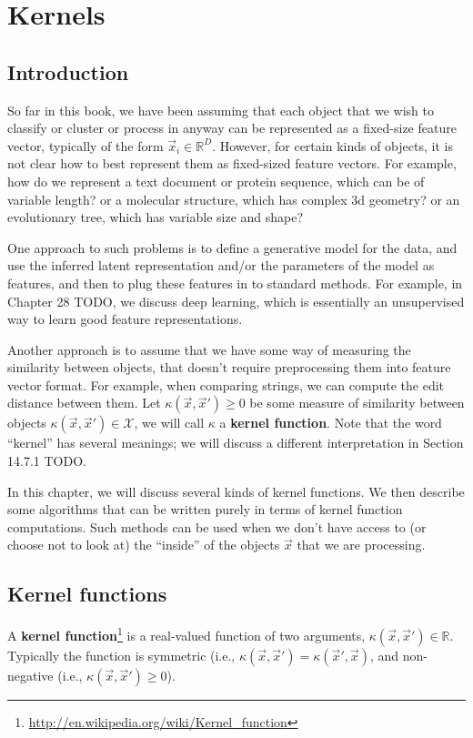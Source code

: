 \chapter{Kernels}
\label{chap:Kernels}

\section{Introduction}
So far in this book, we have been assuming that each object that we wish to classify or cluster or process in anyway can be represented as a fixed-size feature vector, typically of the form $\vec{x}_i \in \mathbb{R}^D$. However, for certain kinds of objects, it is not clear how to best represent them as fixed-sized feature vectors. For example, how do we represent a text document or protein sequence, which can be of variable length? or a molecular structure, which has complex 3d geometry? or an evolutionary tree, which has variable size and shape?

One approach to such problems is to define a generative model for the data, and use the inferred latent representation and/or the parameters of the model as features, and then to plug these features in to standard methods. For example, in Chapter 28 TODO, we discuss deep learning, which is essentially an unsupervised way to learn good feature representations.

Another approach is to assume that we have some way of measuring the similarity between objects, that doesn’t require preprocessing them into feature vector format. For example, when comparing strings, we can compute the edit distance between them. Let $\kappa(\vec{x},\vec{x}') \geq 0$ be some measure of similarity between objects $\kappa(\vec{x},\vec{x}') \in \mathcal{X}$,  we will call $\kappa$ a \textbf{kernel function}. Note that the word “kernel” has several meanings; we will discuss a different interpretation in Section 14.7.1 TODO.

In this chapter, we will discuss several kinds of kernel functions. We then describe some algorithms that can be written purely in terms of kernel function computations. Such methods can be used when we don’t have access to (or choose not to look at) the “inside” of the objects $\vec{x}$ that we are processing.


\section{Kernel functions}
\begin{definition}
A \textbf{kernel function}\footnote{\url{http://en.wikipedia.org/wiki/Kernel_function}} is a real-valued function of two arguments, $\kappa(\vec{x},\vec{x}') \in \mathbb{R}$. Typically the function is symmetric (i.e., $\kappa(\vec{x},\vec{x}')=\kappa(\vec{x}',\vec{x})$, and non-negative (i.e., $\kappa(\vec{x},\vec{x}') \geq 0$). 
\end{definition}

